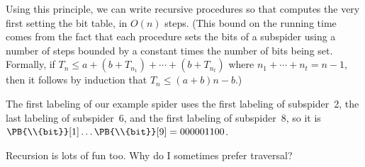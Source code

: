 Using this principle, we can write recursive procedures so that 
computes the very first setting the bit table, in $O(n)$ steps.
(This bound on the running time comes from the fact that each procedure sets
the bits of a subspider using a number of steps bounded by a constant times the
number of bits being set. Formally, if $T_n\le
a+(b+T_{n_1})+\cdots+(b+T_{n_t})$ where $n_1+\cdots+n_t=n-1$, then
it follows by induction that $T_n\le(a+b)n-b$.)

The first labeling of our example spider uses the first labeling
of subspider~2, the last labeling of subspider~6, and the first labeling
of subspider~8, so it is
$\PB{\\{bit}}[1]\ldots\PB{\\{bit}}[9]=000001100$.

Recursion is lots of fun too. Why do I sometimes prefer traversal?

